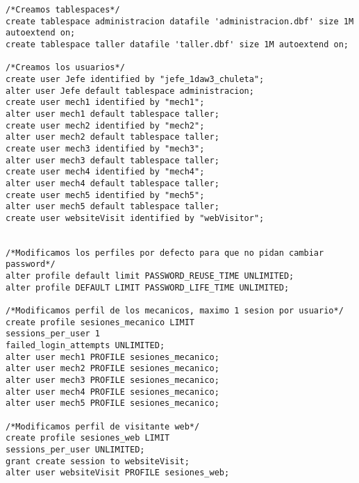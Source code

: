 \begin{lstlisting}[caption=Script .sql para crear la BD (BBDD)]
    /*Creamos tablespaces*/
create tablespace administracion datafile 'administracion.dbf' size 1M autoextend on;
create tablespace taller datafile 'taller.dbf' size 1M autoextend on;

/*Creamos los usuarios*/
create user Jefe identified by "jefe_1daw3_chuleta";
alter user Jefe default tablespace administracion;
create user mech1 identified by "mech1";
alter user mech1 default tablespace taller;
create user mech2 identified by "mech2";
alter user mech2 default tablespace taller;
create user mech3 identified by "mech3";
alter user mech3 default tablespace taller;
create user mech4 identified by "mech4";
alter user mech4 default tablespace taller;
create user mech5 identified by "mech5";
alter user mech5 default tablespace taller;
create user websiteVisit identified by "webVisitor";


/*Modificamos los perfiles por defecto para que no pidan cambiar password*/
alter profile default limit PASSWORD_REUSE_TIME UNLIMITED;
alter profile DEFAULT LIMIT PASSWORD_LIFE_TIME UNLIMITED;

/*Modificamos perfil de los mecanicos, maximo 1 sesion por usuario*/
create profile sesiones_mecanico LIMIT
sessions_per_user 1
failed_login_attempts UNLIMITED;
alter user mech1 PROFILE sesiones_mecanico;
alter user mech2 PROFILE sesiones_mecanico;
alter user mech3 PROFILE sesiones_mecanico;
alter user mech4 PROFILE sesiones_mecanico;
alter user mech5 PROFILE sesiones_mecanico;

/*Modificamos perfil de visitante web*/
create profile sesiones_web LIMIT
sessions_per_user UNLIMITED;
grant create session to websiteVisit;
alter user websiteVisit PROFILE sesiones_web;



\end{lstlisting}
